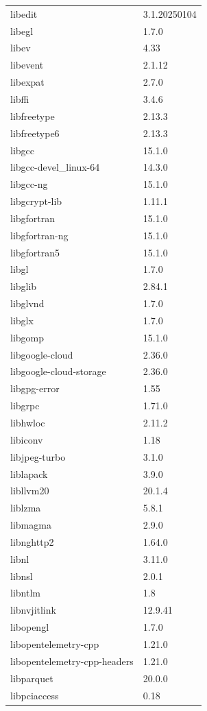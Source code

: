\begin{longtable}{ll}
    libedit&3.1.20250104 \\
    libegl&1.7.0 \\
    libev&4.33 \\
    libevent&2.1.12 \\
    libexpat&2.7.0 \\
    libffi&3.4.6 \\
    libfreetype&2.13.3 \\
    libfreetype6&2.13.3 \\
    libgcc&15.1.0 \\
    libgcc-devel\_linux-64&14.3.0 \\
    libgcc-ng&15.1.0 \\
    libgcrypt-lib&1.11.1 \\
    libgfortran&15.1.0 \\
    libgfortran-ng&15.1.0 \\
    libgfortran5&15.1.0 \\
    libgl&1.7.0 \\
    libglib&2.84.1 \\
    libglvnd&1.7.0 \\
    libglx&1.7.0 \\
    libgomp&15.1.0 \\
    libgoogle-cloud&2.36.0 \\
    libgoogle-cloud-storage&2.36.0 \\
    libgpg-error&1.55 \\
    libgrpc&1.71.0 \\
    libhwloc&2.11.2 \\
    libiconv&1.18 \\
    libjpeg-turbo&3.1.0 \\
    liblapack&3.9.0 \\
    libllvm20&20.1.4 \\
    liblzma&5.8.1 \\
    libmagma&2.9.0 \\
    libnghttp2&1.64.0 \\
    libnl&3.11.0 \\
    libnsl&2.0.1 \\
    libntlm&1.8 \\
    libnvjitlink&12.9.41 \\
    libopengl&1.7.0 \\
    libopentelemetry-cpp&1.21.0 \\
    libopentelemetry-cpp-headers&1.21.0 \\
    libparquet&20.0.0 \\
    libpciaccess&0.18 \\

\end{longtable}
